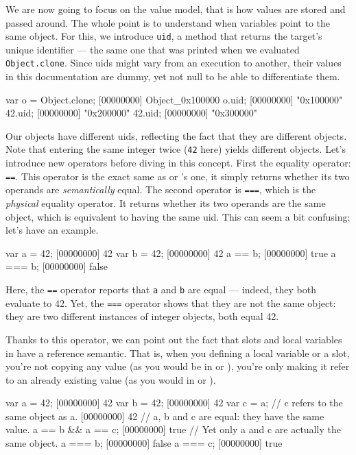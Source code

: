 We are now going to focus on the \us value model, that is how values
are stored and passed around. The whole point is to understand when
variables point to the same object.  For this, we introduce
\lstinline{uid}, a method that returns the target's unique identifier
--- the same one that was printed when we evaluated
\lstinline|Object.clone|.  Since uids might vary from an execution to
another, their values in this documentation are dummy, yet not null to
be able to differentiate them.

\begin{urbiscript}[firstnumber=1]
var o = Object.clone;
[00000000] Object_0x100000
o.uid;
[00000000] "0x100000"
42.uid;
[00000000] "0x200000"
42.uid;
[00000000] "0x300000"
\end{urbiscript}

Our objects have different uids, reflecting the fact that they are
different objects. Note that entering the same integer twice
(\lstinline{42} here) yields different objects. Let's introduce new
operators before diving in this concept. First the equality operator:
\lstinline{==}. This operator is the exact same as \langC or \Cxx's one,
it simply returns whether its two operands are \emph{semantically}
equal. The second operator is \lstinline{===}, which is the
\emph{physical} equality operator. It returns whether its two operands
are the same object, which is equivalent to having the same uid. This
can seem a bit confusing; let's have an example.

\begin{urbiscript}
var a = 42;
[00000000] 42
var b = 42;
[00000000] 42
a == b;
[00000000] true
a === b;
[00000000] false
\end{urbiscript}

Here, the \lstinline{==} operator reports that \lstinline{a} and
\lstinline{b} are equal ---
indeed, they both evaluate to 42. Yet, the \lstinline{===} operator shows
that they are not the same object: they are two different
instances of integer objects, both equal 42.

Thanks to this operator, we can point out the fact that slots and
local variables in \us have a reference semantic. That is, when you
defining a local variable or a slot, you're not copying any value (as
you would be in \langC or \Cxx), you're only making it refer to an already
existing value (as you would in \Ruby or \Java).

\begin{urbiscript}[firstnumber=1]
var a = 42;
[00000000] 42
var b = 42;
[00000000] 42
var c = a; // c refers to the same object as a.
[00000000] 42
// a, b and c are equal: they have the same value.
a == b && a == c;
[00000000] true
// Yet only a and c are actually the same object.
a === b;
[00000000] false
a === c;
[00000000] true
\end{urbiscript}

